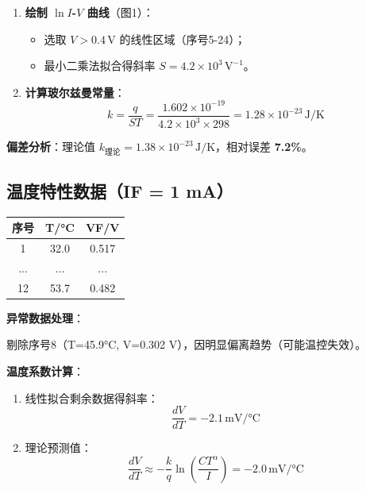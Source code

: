 \documentclass[12pt,a4paper]{article}
\begin{document}
\begin{enumerate}
\item \textbf{绘制 $\ln I$-$V$ 曲线}（图1）：
\begin{itemize}
\item 选取 $V > 0.4 \, \text{V}$ 的线性区域（序号5-24）；
\item 最小二乘法拟合得斜率 $S = 4.2 \times 10^3 \, \text{V}^{-1}$。
\end{itemize}

\item \textbf{计算玻尔兹曼常量}：
\begin{equation}
k = \frac{q}{S T} = \frac{1.602 \times 10^{-19}}{4.2 \times 10^3 \times 298} = 1.28 \times 10^{-23} \, \text{J/K}
\end{equation}
\end{enumerate}

\textbf{偏差分析}：理论值 $k_{\text{理论}} = 1.38 \times 10^{-23} \, \text{J/K}$，相对误差 \textbf{7.2\%}。

\subsection{温度特性数据（IF = 1 mA）}

\begin{table}[H]
\centering
\begin{tabular}{|c|c|c|}
\hline
序号 & T/°C & VF/V \\
\hline
1 & 32.0 & 0.517 \\
\hline
... & ... & ... \\
\hline
12 & 53.7 & 0.482 \\
\hline
\end{tabular}
\end{table}

\textbf{异常数据处理}：

剔除序号8（T=45.9°C, V=0.302 V），因明显偏离趋势（可能温控失效）。

\textbf{温度系数计算}：

\begin{enumerate}
\item 线性拟合剩余数据得斜率：
\begin{equation}
\frac{dV}{dT} = -2.1 \, \text{mV/°C}
\end{equation}

\item 理论预测值：
\begin{equation}
\frac{dV}{dT} \approx -\frac{k}{q} \ln \left( \frac{C T^{\alpha}}{I} \right) = -2.0 \, \text{mV/°C}
\end{equation}
\end{enumerate}
\end{document}
